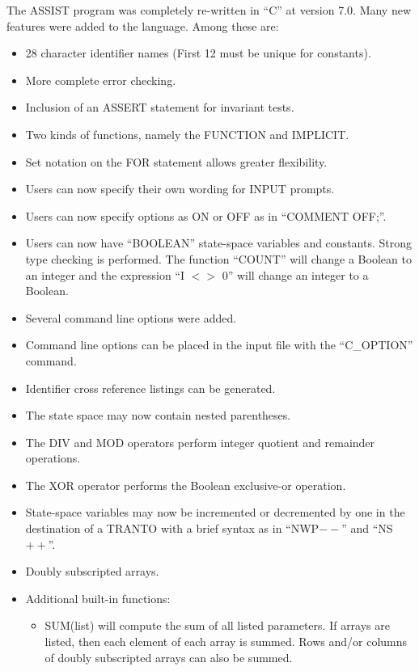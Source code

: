 The ASSIST program was
completely re-written in ``C'' at version 7.0.   Many new features were
added to the language.  Among these are:
\begin{itemize}
\item 28 character identifier names (First 12 must be unique for constants).
\item More complete error checking.
\item Inclusion of an ASSERT statement for invariant tests.
\item Two kinds of functions, namely the FUNCTION and IMPLICIT.
\item Set notation on the FOR statement allows greater flexibility.
\item Users can now specify their own wording for INPUT prompts.
\item Users can now specify options as ON or OFF as in ``COMMENT OFF;''.
\item Users can now have ``BOOLEAN'' state-space variables and constants.
      Strong type checking is performed.   The function ``COUNT'' will
      change a Boolean to an integer and the expression ``I $<>$ 0'' will
      change an integer to a Boolean.
\item Several command line options were added.
\item Command line options can be placed in the input file
      with the ``C\_OPTION'' command.
\item Identifier cross reference listings can be generated.
\item The state space may now contain nested parentheses.
\item The DIV and MOD operators perform integer quotient and remainder
      operations.
\item The XOR operator performs the Boolean exclusive-or operation.
\item State-space variables may now be incremented or decremented by one
      in the destination of a TRANTO with a brief syntax as in ``NWP$--$'' and
      ``NS$++$''.
\item Doubly subscripted arrays.
\item Additional built-in functions:
      \begin{itemize}
      \item SUM(list) will compute the sum of all listed parameters.  If arrays
                      are listed, then each element of each array is summed.
                      Rows and/or columns of doubly subscripted arrays can also
                      be summed.

\end{itemize}
\end{itemize}
